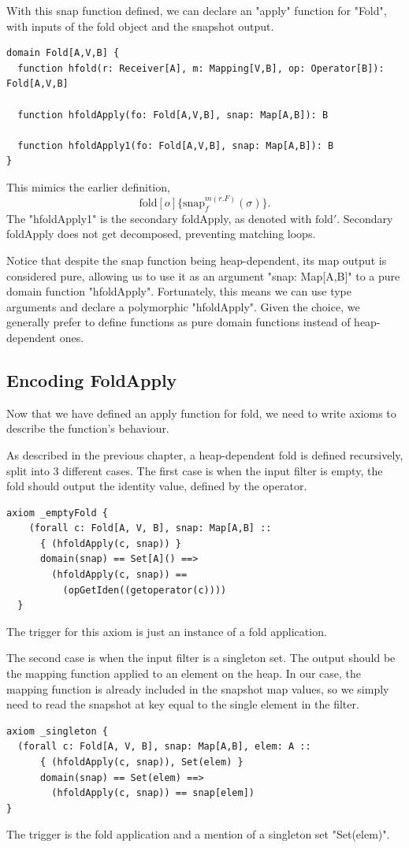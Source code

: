 \documentclass[msc,oneside]{ubcthesis}
\begin{document}
With this snap function defined, we can declare an "apply" function for "Fold", with inputs of the fold object and the snapshot output.
\begin{lstlisting}
domain Fold[A,V,B] {
  function hfold(r: Receiver[A], m: Mapping[V,B], op: Operator[B]): Fold[A,V,B]

  function hfoldApply(fo: Fold[A,V,B], snap: Map[A,B]): B

  function hfoldApply1(fo: Fold[A,V,B], snap: Map[A,B]): B
}
\end{lstlisting}
This mimics the earlier definition,
$$\textrm{fold}[o]\{\textrm{snap}^{m(r.F)}_{f}(\sigma)\}.$$ The "hfoldApply1" is the secondary foldApply, as denoted with $\textrm{fold}'$. Secondary foldApply does not get decomposed, preventing matching loops. 

Notice that despite the snap function being heap-dependent, its map output is considered pure, allowing us to use it as an argument "snap: Map[A,B]" to a pure domain function "hfoldApply". Fortunately, this means we can use type arguments and declare a polymorphic "hfoldApply". Given the choice, we generally prefer to define functions as pure domain functions instead of heap-dependent ones. 

\subsection{Encoding FoldApply}
Now that we have defined an apply function for fold, we need to write axioms to describe the function's behaviour. 

As described in the previous chapter, a heap-dependent fold is defined recursively, split into 3 different cases. The first case is when the input filter is empty, the fold should output the identity value, defined by the operator.
\begin{lstlisting}
axiom _emptyFold {
    (forall c: Fold[A, V, B], snap: Map[A,B] ::
      { (hfoldApply(c, snap)) }
      domain(snap) == Set[A]() ==>
        (hfoldApply(c, snap)) == 
          (opGetIden((getoperator(c))))
  }
\end{lstlisting}
The trigger for this axiom is just an instance of a fold application.

The second case is when the input filter is a singleton set. The output should be the mapping function applied to an element on the heap. In our case, the mapping function is already included in the snapshot map values, so we simply need to read the snapshot at key equal to the single element in the filter.
\begin{lstlisting}
axiom _singleton {
  (forall c: Fold[A, V, B], snap: Map[A,B], elem: A ::
      { (hfoldApply(c, snap)), Set(elem) }
      domain(snap) == Set(elem) ==>
        (hfoldApply(c, snap)) == snap[elem])
}
\end{lstlisting}
The trigger is the fold application and a mention of a singleton set "Set(elem)". 
\end{document}
